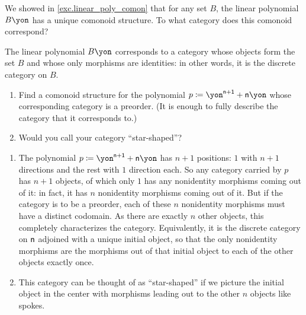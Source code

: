 \documentclass[Book-Poly]{subfiles}
\begin{document}
\begin{exercise} \label{exc.linear_poly_cat}
We showed in \cref{exc.linear_poly_comon} that for any set $B$, the linear polynomial $B\yon$ has a unique comonoid structure.
To what category does this comonoid correspond?
\begin{solution}
The linear polynomial $B\yon$ corresponds to a category whose objects form the set $B$ and whose only morphisms are identities: in other words, it is the discrete category on $B$.
\end{solution}
\end{exercise}

\begin{exercise}\label{ex.star_shaped}
\begin{enumerate}
	\item Find a comonoid structure for the polynomial $p\coloneqq{\yon}^{\ord{n}+\1}+\ord{n}\yon$ whose corresponding category is a preorder.
	(It is enough to fully describe the category that it corresponds to.)
	\item Would you call your category ``star-shaped''?
\qedhere
\end{enumerate}
\begin{solution}
\begin{enumerate}
    \item The polynomial $p\coloneqq{\yon}^{\ord{n}+\1}+\ord{n}\yon$ has $n+1$ positions: $1$ with $n+1$ directions and the rest with $1$ direction each.
    So any category carried by $p$ has $n+1$ objects, of which only $1$ has any nonidentity morphisms coming out of it: in fact, it has $n$ nonidentity morphisms coming out of it.
    But if the category is to be a preorder, each of these $n$ nonidentity morphisms must have a distinct codomain.
    As there are exactly $n$ other objects, this completely characterizes the category.
    Equivalently, it is the discrete category on $\mathsf{n}$ adjoined with a unique initial object, so that the only nonidentity morphisms are the morphisms out of that initial object to each of the other objects exactly once.
    \item This category can be thought of as ``star-shaped'' if we picture the initial object in the center with morphisms leading out to the other $n$ objects like spokes.
\end{enumerate}
\end{solution}
\end{exercise}
\end{document}
